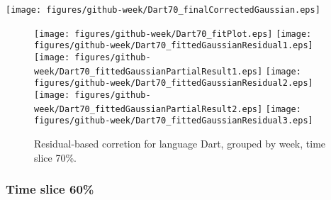 \begin{center}
{\texttt{[image: figures/github-week/Dart70\_finalCorrectedGaussian.eps]}}
\end{center}

\FloatBarrier

\begin{figure}[t]
\centering
{}
{\texttt{[image: figures/github-week/Dart70\_fitPlot.eps]}}
{\texttt{[image: figures/github-week/Dart70\_fittedGaussianResidual1.eps]}}
{\texttt{[image: figures/github-week/Dart70\_fittedGaussianPartialResult1.eps]}}
{\texttt{[image: figures/github-week/Dart70\_fittedGaussianResidual2.eps]}}
{\texttt{[image: figures/github-week/Dart70\_fittedGaussianPartialResult2.eps]}}
{\texttt{[image: figures/github-week/Dart70\_fittedGaussianResidual3.eps]}}
\caption{Residual-based corretion for language Dart, grouped by week, time slice 70\%.}
\end{figure}


\FloatBarrier


\subsubsection{Time slice 60\%}

